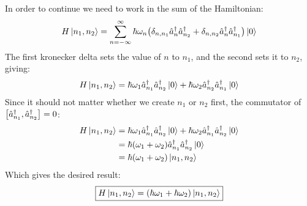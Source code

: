 \documentclass[12pt]{article}
\newcommand{\kd}[2]{\delta_{#1,#2}}
\begin{document}
In order to continue we need to work in the sum of the Hamiltonian:
\begin{align*}
  H\ket{n_1,n_2}=\sum_{n=-\infty}^\infty\hbar\omega_n
  \qty(\kd{n}{n_1}\hat{a}_n^\dag\hat{a}^\dag_{n_2}
  +\kd{n}{n_2}\hat{a}_n^\dag\hat{a}^\dag_{n_1})\ket{0}
\end{align*}
The first kronecker delta sets the value of $n$ to $n_1$, and the second sets it to $n_2$, giving:
\begin{align*}
  H\ket{n_1,n_2}=\hbar\omega_1\hat{a}_{n_1}^\dag\hat{a}^\dag_{n_2}\ket{0}
  +\hbar\omega_2\hat{a}_{n_2}^\dag\hat{a}^\dag_{n_1}\ket{0}
\end{align*}
Since it should not matter whether we create $n_1$ or $n_2$ first, the commutator of $\comm{\hat{a}^\dag_{n_1}}{\hat{a}^\dag_{n_2}}=0$:
\begin{align*}
  H\ket{n_1,n_2}&=\hbar\omega_1\hat{a}_{n_1}^\dag\hat{a}^\dag_{n_2}\ket{0}
  +\hbar\omega_2\hat{a}_{n_1}^\dag\hat{a}^\dag_{n_2}\ket{0}\\
  &=\hbar\qty(\omega_1+\omega_2)\hat{a}_{n_1}^\dag\hat{a}^\dag_{n_2}\ket{0}\\
  &=\hbar\qty(\omega_1+\omega_2)\ket{n_1,n_2}
\end{align*}
Which gives the desired result:
\begin{align}
  \boxed{H\ket{n_1,n_2}=\qty(\hbar\omega_1+\hbar\omega_2)\ket{n_1,n_2}}
\end{align}
\end{document}
